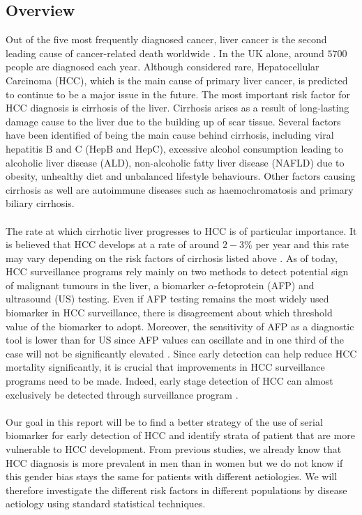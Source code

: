 \documentclass[11pt,twoside]{article}
\numberwithin{Theorem}{section}
\numberwithin{Definition}{section}
\numberwithin{Lemma}{section}
\numberwithin{Algorithm}{section}
\numberwithin{equation}{section}
\begin{document}
\subsection{Overview}
%
Out of the five most frequently diagnosed cancer, liver cancer is the second leading cause of cancer-related death worldwide \cite{jemal2011global}. In the UK alone, around $5700$ people are diagnosed each year. Although considered rare, Hepatocellular Carcinoma (HCC), which is the main cause of primary liver cancer, is predicted to continue to be a major issue in the future. The most important risk factor for HCC diagnosis is cirrhosis of the liver. Cirrhosis arises as a result of long-lasting damage cause to the liver due to the building up of scar tissue. Several factors have been identified of being the main cause behind cirrhosis, including viral hepatitis B and C (HepB and HepC), excessive alcohol consumption leading to alcoholic liver disease (ALD), non-alcoholic fatty liver disease (NAFLD) due to obesity, unhealthy diet and unbalanced lifestyle behaviours. Other factors causing cirrhosis as well are autoimmune diseases such as haemochromatosis and primary biliary cirrhosis. \\ \\
%
The rate at which cirrhotic liver progresses to HCC is of particular importance. It is believed that HCC develops at a rate of around $2-3\%$ per year and this rate may vary depending on the risk factors of cirrhosis listed above \cite{coon2007surveillance}. As of today, HCC surveillance programs rely mainly on two methods to detect potential sign of malignant tumours in the liver, a biomarker $\alpha$-fetoprotein (AFP) and ultrasound (US) testing. Even if AFP testing remains the most widely used biomarker in HCC surveillance, there is disagreement about which threshold value of the biomarker to adopt. Moreover, the sensitivity of AFP as a diagnostic tool is lower than for US since AFP values can oscillate and in one third of the case will not be significantly elevated \cite{gupta2003test}.  Since early detection can help reduce HCC mortality significantly, it is crucial that improvements in HCC surveillance programs need to be made. Indeed, early stage detection of HCC can almost exclusively be detected through surveillance program \cite{Tayob2016}. %
\\ \\
%
Our goal in this report will be to find a better strategy of the use of serial biomarker for early detection of HCC and identify strata of patient that are more vulnerable to HCC development. From previous studies, we already know that HCC diagnosis is more prevalent in men than in women but we do not know if this gender bias stays the same for patients with different aetiologies. We will therefore investigate the different risk factors in different populations by disease aetiology using standard statistical techniques. \\ \\
\end{document}
